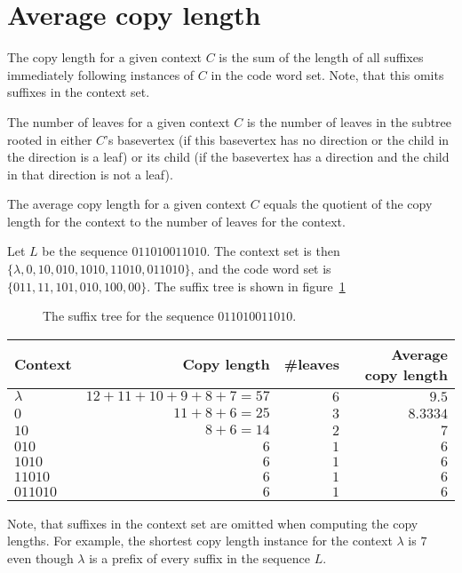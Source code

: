 \documentclass[a4paper,11pt]{report}
\begin{document}
\section{Average copy length}
\begin{definition}
The copy length for a given context $C$ is the sum of the length of all suffixes immediately following instances of $C$ in
the code word set. Note, that this omits suffixes in the context set.
\end{definition}
\begin{definition}
 The number of leaves for a given context $C$ is the number of leaves in the subtree rooted in either $C$'s basevertex 
(if this basevertex has no direction or the child in the direction is a leaf) or its child (if the basevertex has a
direction and the child in that direction is not a leaf).
\end{definition}
\begin{definition}
The average copy length for a given context $C$ equals the quotient of the copy length for the context to the
number of leaves for the context.
\end{definition}
\begin{example}
Let $L$ be the sequence $011010011010$. The context set is then $\{\lambda, 0, 10, 010, 1010, 11010, 011010\}$, and
the code word set is $\{011, 11, 101, 010, 100, 00\}$. The suffix tree is shown in figure~\ref{fig:stree1}
\end{example}
\begin{figure}
  \centering
  \caption{The suffix tree for the sequence $011010011010$.}
  \label{fig:stree1}
\end{figure}
\begin{center}
\begin{tabular}{|l|r|r|r|} \hline
Context   & Copy length                     & \#leaves & Average copy length \\ \hline
$\lambda$ & $12 + 11 + 10 + 9 + 8 + 7 = 57$ & $6$     & $9.5   $            \\ \hline
$0$       & $11 + 8 + 6 = 25$               & $3$     & $8.3334$            \\ \hline
$10$      & $8 + 6 = 14$                    & $2$     & $7     $            \\ \hline
$010$     & $6$                             & $1$     & $6     $            \\ \hline
$1010$    & $6$                             & $1$     & $6     $            \\ \hline
$11010$   & $6$                             & $1$     & $6     $            \\ \hline
$011010$  & $6$                             & $1$     & $6     $            \\ \hline
\end{tabular}
\end{center}
Note, that suffixes in the context set are omitted when computing the copy lengths. For example,
the shortest copy length instance for the context $\lambda$ is $7$ even though $\lambda$ is a prefix
of every suffix in the sequence $L$.
\end{document}

